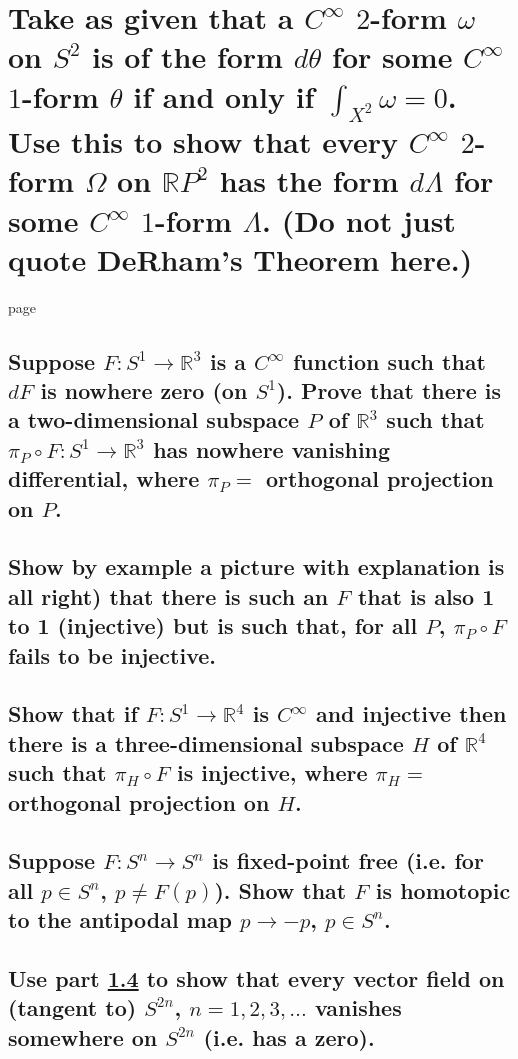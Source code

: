 \documentclass[10pt]{article}
\begin{document}
\section{Take as given that a $C^\infty$ $2$-form $\omega$ on $S^2$ is of the form $d \theta$ for
  some $C^\infty$ $1$-form $\theta$ if and only if $\int_{X^2} \omega =0$. Use this to show that
  every $C^\infty$ $2$-form $\Omega$ on $\mathbb{R} P^2$ has the form $d \Lambda $ for some
  $C^\infty$ $1$-form $\Lambda$. (Do not just quote DeRham's Theorem here.)}

page

\advsection{}

\subsection{Suppose $F: S^1 \to \mathbb{R}^3$ is a $C^\infty$ function such that $dF$ is nowhere
  zero (on $S^1$). Prove that there is a two-dimensional subspace $P$ of $\mathbb{R} ^3$ such that
  $\pi_P \circ F : S^1 \to \mathbb{R}^3$ has nowhere vanishing differential, where $\pi_P =$
  orthogonal projection on $P$.}

\subsection{Show by example a picture with explanation is all right) that there is such an
  $F$ that is also 1 to 1 (injective) but is such that, for all $P$, $\pi_P \circ F$ fails to be
  injective.}

\subsection{Show that if $F: S^1 \to \mathbb{R}^4$ is $C^\infty$ and injective then there is a
  three-dimensional subspace $H$ of $\mathbb{R} ^4$ such that $\pi_H \circ F $ is injective, where
  $\pi_H =$ orthogonal projection on $H$.}

\advsection{}

\subsection{Suppose $F:S^n \to S^n$ is fixed-point free (i.e. for all $ p \in S^n$, $p \neq
  F(p)$). Show that $F$ is homotopic to the antipodal map $p \to -p$, $p \in S^n$.}
\label{antip}

\subsection{Use part \ref{antip} to show that every vector field on (tangent to) $S^{2n}$,
  $n=1,2,3,\dots$ vanishes somewhere on $S^{2n}$ (i.e. has a zero).}
\end{document}
